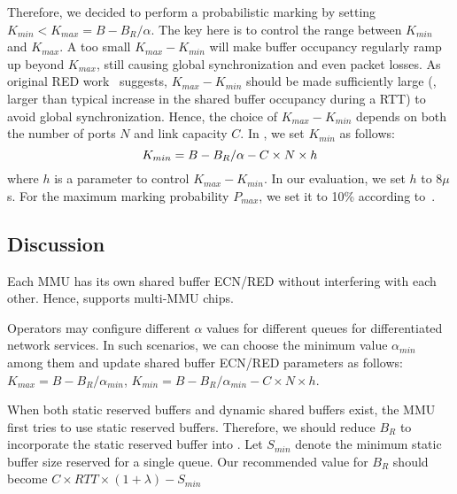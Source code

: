 Therefore, we decided to perform a probabilistic marking by setting $K_{min}<K_{max}=B-B_{R}/\alpha$. The key here is to control the range between $K_{min}$ and $K_{max}$. A too small $K_{max}-K_{min}$ will make buffer occupancy regularly ramp up beyond $K_{max}$, still causing global synchronization and even packet losses. As original RED work~\cite{RED} suggests, $K_{max}-K_{min}$ should be made sufficiently large (\eg, larger than typical increase in the shared buffer occupancy during a RTT) to avoid global synchronization. Hence, the choice of $K_{max}-K_{min}$ depends on both the number of ports $N$ and link capacity $C$. In \sys, we set $K_{min}$ as follows:
\vspace{-3mm}
\begin{equation}
\vspace{-1mm}
\displaystyle K_{min}=B-B_{R}/\alpha-C\times N\times h\label{eq:k_min}
\vspace{-1mm}
\end{equation}
where $h$ is a parameter to control $K_{max}-K_{min}$. In our evaluation, we set $h$ to 8$\mu$s. For the maximum marking probability $P_{max}$, we set it to 10\% according to~\cite{RED}.

\subsection{Discussion}\label{subsec:discussion}
\vspace{-1mm}
Each MMU has its own shared buffer ECN/RED without interfering with each other. Hence, \sys supports multi-MMU chips.

\vspace{-1mm}
Operators may configure different $\alpha$ values for different queues for differentiated network services. In such scenarios, we can choose the minimum value $\alpha_{min}$ among them and update shared buffer ECN/RED parameters as follows: $K_{max}=B-B_{R}/\alpha_{min}$, $K_{min}=B-B_{R}/\alpha_{min}-C\times N\times h$.

\vspace{-1mm}
When both static reserved buffers and dynamic shared buffers exist, the MMU first tries to use static reserved buffers. Therefore, we should reduce $B_R$ to incorporate the static reserved buffer into \sys. Let $S_{min}$ denote the minimum static buffer size reserved for a single queue. Our recommended value for $B_R$ should become $C\times RTT\times (1+\lambda)-S_{min}$




